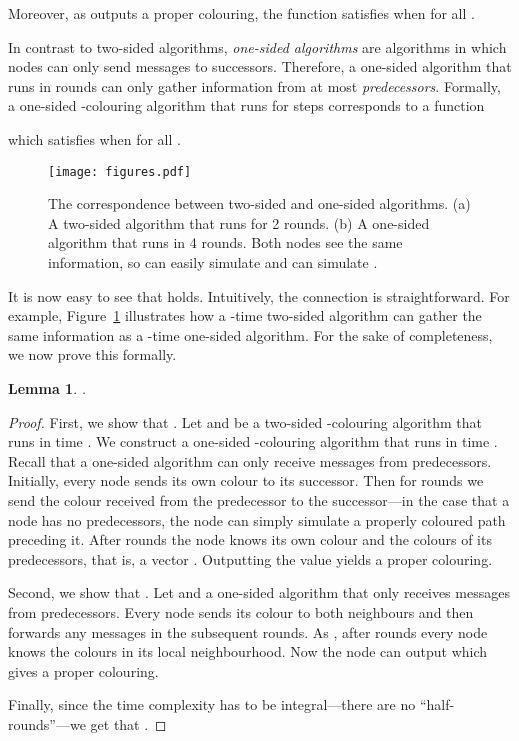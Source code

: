 \documentclass[a4paper,11pt]{article}
\newtheorem{lemma}[theorem]{Lemma}
\theoremstyle{remark}
\begin{document}
Moreover, as  outputs a proper colouring, the function satisfies  when  for all .

In contrast to two-sided algorithms, \emph{one-sided algorithms} are algorithms in which nodes can only send messages to successors. Therefore, a one-sided algorithm that runs in  rounds can only gather information from at most  \emph{predecessors}. Formally, a one-sided -colouring algorithm  that runs for  steps corresponds to a function

which satisfies  when  for all .

\begin{figure}[t]
    \centering
    \texttt{[image: figures.pdf]}
    \caption{The correspondence between two-sided and one-sided algorithms. (a) A two-sided algorithm  that runs for 2 rounds. (b) A one-sided algorithm that runs in 4 rounds. Both nodes see the same information, so  can easily simulate  and  can simulate . \label{fig:equivalence}}
\end{figure}

It is now easy to see that  holds. Intuitively, the connection is straightforward. For example, Figure~\ref{fig:equivalence} illustrates how a -time two-sided algorithm can gather the same information as a -time one-sided algorithm. For the sake of completeness, we now prove this formally.

\begin{lemma}\label{lemma:hardness}
.
\end{lemma}
\begin{proof}
 First, we show that . Let  and  be a two-sided -colouring algorithm that runs in time . We construct a one-sided -colouring algorithm that runs in time . Recall that a one-sided algorithm can only receive messages from predecessors. Initially, every node sends its own colour to its successor. Then for  rounds we send the colour received from the predecessor to the successor---in the case that a node has no predecessors, the node can simply simulate a properly coloured path preceding it. After  rounds the node knows its own colour and the colours of its  predecessors, that is, a vector . Outputting the value  yields a proper colouring. 

 Second, we show that . Let  and  a one-sided algorithm that only receives messages from predecessors. Every node sends its colour to both neighbours and then forwards any messages in the  subsequent rounds. As , after  rounds every node knows the colours  in its local neighbourhood. Now the node can output  which gives a proper colouring.

 Finally, since the time complexity has to be integral---there are no ``half-rounds''---we get that .
\end{proof}
\end{document}
